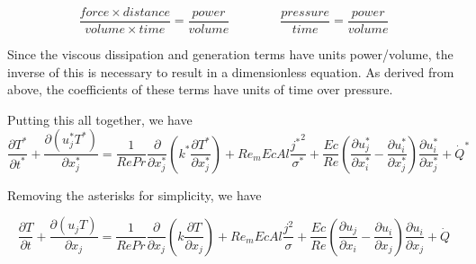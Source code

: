 \documentclass[11pt]{article}
\begin{document}
\begin{equation}
	\frac{force \times distance}{volume \times time} = \frac{power}{volume}
	\qquad \qquad
	\frac{pressure}{time} = \frac{power}{volume}
\end{equation}

Since the viscous dissipation and generation terms have units power/volume, the inverse of this is necessary to result in a dimensionless equation. As derived from above, the coefficients of these terms have units of time over pressure.

Putting this all together, we have
\begin{equation}
	\frac{\partial T^*}{\partial t^*} +
	\frac{\partial (u_j^* T^*)}{\partial x_j^*}
	= 
	\frac{1}{Re Pr}
	\frac{\partial}{\partial x_j^*}
	\left( 
	k^* \frac{\partial T^*}{\partial x_j^*}
	\right) + 
	Re_m Ec Al
	\frac{{j^*}^2}{\sigma^*} +
	\frac{Ec}{Re}
	\left(
	\frac{\partial u_j^*}{\partial x_i^*}
	-
	\frac{\partial u_i^*}{\partial x_j^*}
	\right)
	\frac{\partial u_i^*}{\partial x_j^*} +
	\dot{Q}^*
\end{equation}

Removing the asterisks for simplicity, we have

\begin{equation}
	\frac{\partial T}{\partial t} +
	\frac{\partial (u_j T)}{\partial x_j}
	= 
	\frac{1}{Re Pr}
	\frac{\partial}{\partial x_j}
	\left( 
	k \frac{\partial T}{\partial x_j}
	\right) + 
	Re_m Ec Al
	\frac{{j}^2}{\sigma} +
	\frac{Ec}{Re}
	\left(
	\frac{\partial u_j}{\partial x_i}
	-
	\frac{\partial u_i}{\partial x_j}
	\right)
	\frac{\partial u_i}{\partial x_j} +
	\dot{Q}
\end{equation}





\end{document}
